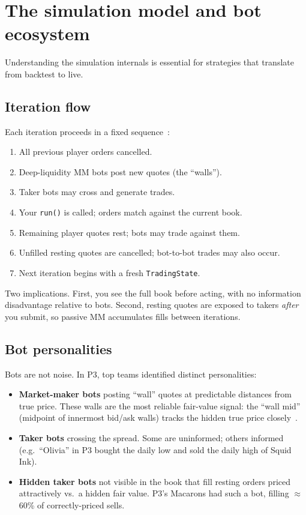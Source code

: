 \section{The simulation model and bot ecosystem}
\label{sec:prosperity_sim}

Understanding the simulation internals is essential for strategies that
translate from backtest to live.

\subsection{Iteration flow}

Each iteration proceeds in a fixed
sequence~\citep{frankfurthedgehogs2025}:
\begin{enumerate}
  \item All previous player orders cancelled.
  \item Deep-liquidity MM bots post new quotes (the ``walls'').
  \item Taker bots may cross and generate trades.
  \item Your \texttt{run()} is called; orders match against the current
  book.
  \item Remaining player quotes rest; bots may trade against them.
  \item Unfilled resting quotes are cancelled; bot-to-bot trades may
  also occur.
  \item Next iteration begins with a fresh \texttt{TradingState}.
\end{enumerate}

Two implications.  First, you see the full book before acting, with no
information disadvantage relative to bots.  Second, resting quotes are
exposed to takers \emph{after} you submit, so passive MM accumulates
fills between iterations.

\subsection{Bot personalities}

Bots are not noise.  In P3, top teams identified distinct personalities:

\begin{itemize}
  \item \textbf{Market-maker bots} posting ``wall'' quotes at predictable
  distances from true price.  These walls are the most reliable
  fair-value signal: the ``wall mid'' (midpoint of innermost bid/ask
  walls) tracks the hidden true price
  closely~\citep{frankfurthedgehogs2025}.

  \item \textbf{Taker bots} crossing the spread.  Some are uninformed;
  others informed (e.g.\ ``Olivia'' in P3 bought the daily low and sold
  the daily high of Squid Ink).

  \item \textbf{Hidden taker bots} not visible in the book that fill
  resting orders priced attractively vs.\ a hidden fair value.  P3's
  Macarons had such a bot, filling $\approx$60\% of correctly-priced
  sells.
\end{itemize}


